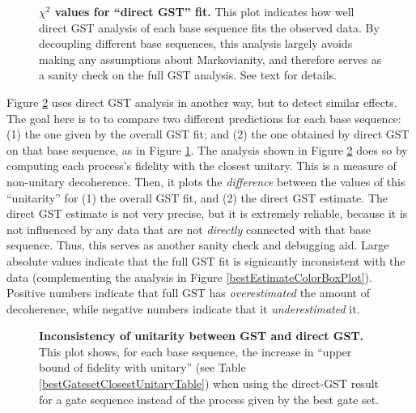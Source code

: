 {\begin{figure}
\begin{center}
\caption{\textbf{$\chi^2$ values for ``direct GST'' fit.}  This plot indicates how well direct GST analysis of each base sequence fits the observed data.  By decoupling different base sequences, this analysis largely avoids making any assumptions about Markovianity, and therefore serves as a sanity check on the full GST analysis.  See text for details.\label{directLSGSTChi2BoxPlot}}
\end{center}
\end{figure}

Figure \ref{directLSGSTDeviationBoxPlot} uses direct GST analysis in another way, but to detect similar effects.   The goal here is to to compare two different predictions for each base sequence:  (1) the one given by the overall GST fit; and (2) the one obtained by direct GST on that base sequence, as in Figure \ref{directLSGSTChi2BoxPlot}.  The analysis shown in Figure \ref{directLSGSTDeviationBoxPlot} does so by computing each process's fidelity with the closest unitary.  This is a measure of non-unitary decoherence.  Then, it plots the \emph{difference} between the values of this ``unitarity'' for (1) the overall GST fit, and (2) the direct GST estimate.  The direct GST estimate is not very precise, but it is extremely reliable, because it is not influenced by any data that are not \emph{directly} connected with that base sequence.  Thus, this serves as another sanity check and debugging aid.  Large absolute values indicate that the full GST fit is signicantly inconsistent with the data (complementing the analysis in Figure \ref{bestEstimateColorBoxPlot}).  Positive numbers indicate that full GST has \emph{overestimated} the amount of decoherence, while negative numbers indicate that it \emph{underestimated} it.

\begin{figure}
\begin{center}
\caption{\textbf{Inconsistency of unitarity between GST and direct GST.}  This plot shows, for each base sequence, the increase in ``upper bound of fidelity with unitary'' (see Table \ref{bestGatesetClosestUnitaryTable}) when using the direct-GST result for a gate sequence instead of the process given by the best gate set.\label{directLSGSTDeviationBoxPlot}}
\end{center}
\end{figure}

}
